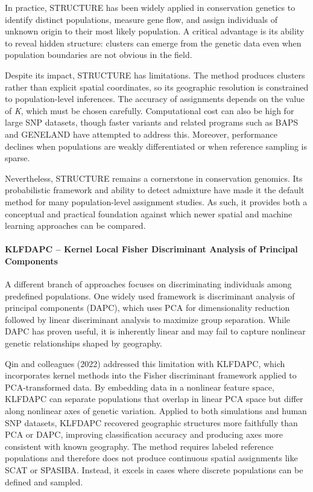 \documentclass[twocolumn,10pt]{article}
\begin{document}
In practice, STRUCTURE has been widely applied in conservation genetics to identify distinct
populations, measure gene flow, and assign individuals of unknown origin to their most likely
population. A critical advantage is its ability to reveal hidden structure: clusters can emerge from
the genetic data even when population boundaries are not obvious in the field.

Despite its impact, STRUCTURE has limitations. The method produces clusters rather than explicit
spatial coordinates, so its geographic resolution is constrained to population-level inferences. The
accuracy of assignments depends on the value of \textit{K}, which must be chosen carefully.
Computational cost can also be high for large SNP datasets, though faster variants and related
programs such as BAPS and GENELAND have attempted to address this. Moreover, performance declines
when populations are weakly differentiated or when reference sampling is sparse.

Nevertheless, STRUCTURE remains a cornerstone in conservation genomics. Its probabilistic framework
and ability to detect admixture have made it the default method for many population-level assignment
studies. As such, it provides both a conceptual and practical foundation against which newer spatial
and machine learning approaches can be compared.

\paragraph{KLFDAPC – Kernel Local Fisher Discriminant Analysis of Principal Components}

A different branch of approaches focuses on discriminating individuals among predefined populations.
One widely used framework is discriminant analysis of principal components (DAPC), which uses PCA
for dimensionality reduction followed by linear discriminant analysis to maximize group separation.
While DAPC has proven useful, it is inherently linear and may fail to capture nonlinear genetic
relationships shaped by geography.

Qin and colleagues (2022) \citep{qin2022klfdapc} addressed this limitation with KLFDAPC, which
incorporates kernel methods into the Fisher discriminant framework applied to PCA-transformed data.
By embedding data in a nonlinear feature space, KLFDAPC can separate populations that overlap in
linear PCA space but differ along nonlinear axes of genetic variation. Applied to both simulations
and human SNP datasets, KLFDAPC recovered geographic structures more faithfully than PCA or DAPC,
improving classification accuracy and producing axes more consistent with known geography. The
method requires labeled reference populations and therefore does not produce continuous spatial
assignments like SCAT or SPASIBA. Instead, it excels in cases where discrete populations can be
defined and sampled.
\end{document}
